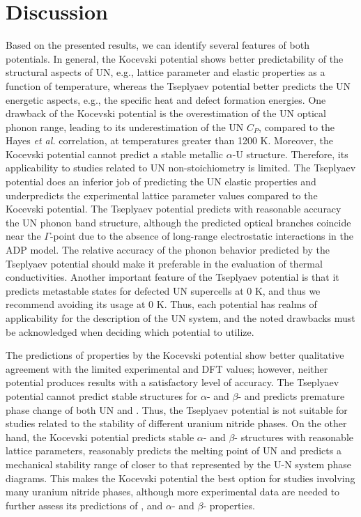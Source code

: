 \documentclass[preprint, 12pt]{elsarticle}
\begin{document}
\section{Discussion}

Based on the presented results, we can identify several features of both potentials. In general, the Kocevski potential shows better predictability of the structural aspects of UN, e.g., lattice parameter and elastic properties as a function of temperature, whereas the Tseplyaev potential better predicts the UN energetic aspects, e.g., the specific heat and defect formation energies. One drawback of the Kocevski potential is the overestimation of the UN optical phonon range, leading to its underestimation of the UN $C_P$, compared to the Hayes \textit{et al.} \cite{Hayes1990IV} correlation, at temperatures greater than 1200 K. Moreover, the Kocevski potential cannot predict a stable metallic $\alpha$-U structure. Therefore, its applicability to studies related to UN non-stoichiometry is limited. The Tseplyaev potential does an inferior job of predicting the UN elastic properties and underpredicts the experimental lattice parameter values compared to the Kocevski potential. The Tseplyaev potential predicts with reasonable accuracy the UN phonon band structure, although the predicted optical branches coincide near the $\Gamma$-point due to the absence of long-range electrostatic interactions in the ADP model. The relative accuracy of the phonon behavior predicted by the Tseplyaev potential should make it preferable in the evaluation of thermal conductivities. Another important feature of the Tseplyaev potential is that it predicts metastable states for defected UN supercells at 0 K, and thus we recommend avoiding its usage at 0 K. Thus, each potential has realms of applicability for the description of the UN system, and the noted drawbacks must be acknowledged when deciding which potential to utilize. 

The predictions of  properties by the Kocevski potential show better qualitative agreement with the limited experimental and DFT values; however, neither potential produces results with a satisfactory level of accuracy. The Tseplyaev potential cannot predict stable structures for $\alpha$- and $\beta$- and predicts premature phase change of both UN and . Thus, the Tseplyaev potential is not suitable for studies related to the stability of different uranium nitride phases. On the other hand, the Kocevski potential predicts stable $\alpha$- and $\beta$- structures with reasonable lattice parameters, reasonably predicts the melting point of UN and predicts a mechanical stability range of  closer to that represented by the U-N system phase diagrams. This makes the Kocevski potential the best option for studies involving many uranium nitride phases, although more experimental data are needed to further assess its predictions of , and $\alpha$- and $\beta$- properties.
\end{document}
